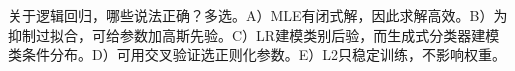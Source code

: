 关于逻辑回归，哪些说法正确？多选。A）MLE有闭式解，因此求解高效。B）为抑制过拟合，可给参数加高斯先验。C）LR建模类别后验，而生成式分类器建模类条件分布。D）可用交叉验证选正则化参数。E）L2只稳定训练，不影响权重。
